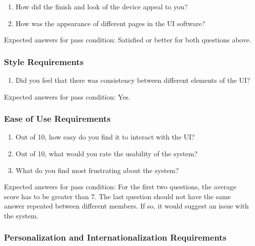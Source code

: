 \documentclass[12pt, titlepage]{article}
\begin{document}
\begin{enumerate}
\item{How did the finish and look of the device appeal to you?\\}
\item{How was the appearance of different pages in the UI software?\\}

\end{enumerate}

\noindent Expected answers for pass condition: Satisfied or better for both questions above.


\subsubsection{Style Requirements}

\begin{enumerate}
\item{Did you feel that there was consistency between different elements of the UI?\\}

\end{enumerate}

\noindent Expected answers for pass condition: Yes.


\subsubsection{Ease of Use Requirements}

\begin{enumerate}
\item{Out of 10, how easy do you find it to interact with the UI?\\}
\item{Out of 10, what would you rate the usability of the system?\\}
\item{What do you find most frustrating about the system?\\}

\end{enumerate}

\noindent Expected answers for pass condition: For the first two questions, the average score has to be greater than 7. The last question should not have the same answer repeated between different members. If so, it would suggest an issue with the system. 


\subsubsection{Personalization and Internationalization Requirements}
\end{document}
